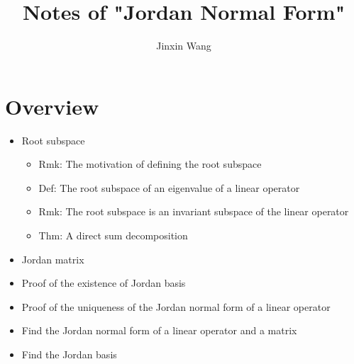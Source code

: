 \documentclass[onecolumn]{ctexart}
\title{Notes of "Jordan Normal Form"}
\author{Jinxin Wang}
\date{}
\begin{document}
\maketitle

\section{Overview}
\begin{itemize}
  \item Root subspace
  \begin{itemize}
    \item Rmk: The motivation of defining the root subspace
    \item Def: The root subspace of an eigenvalue of a linear operator
    \item Rmk: The root subspace is an invariant subspace of the linear operator
    \item Thm: A direct sum decomposition
  \end{itemize}
  \item Jordan matrix
  \item Proof of the existence of Jordan basis
  \item Proof of the uniqueness of the Jordan normal form of a linear operator
  \item Find the Jordan normal form of a linear operator and a matrix
  \item Find the Jordan basis
\end{itemize}
\end{document}
